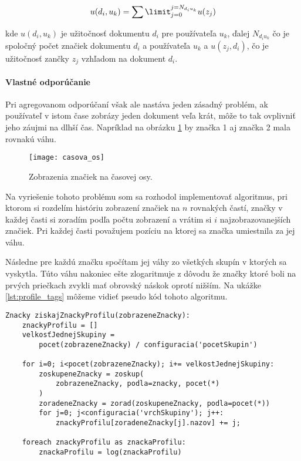 \begin{equation}\label{eq:aggregated_recommendation}
u(d_i, u_k) = \sum\limit_{j = 0}^{j = N_{d_i u_k}} u(z_j)
\end{equation}

kde \(u(d_i, u_k)\) je užitočnosť dokumentu \(d_i\) pre používateľa \(u_k\),
ďalej \(N_{d_i u_k}\) čo je spoločný počet značiek dokumentu \(d_i\) a používateľa
\(u_k\) a \(u(z_j, d_i)\), čo je užitočnosť zančky \(z_j\) vzhľadom na dokument 
\(d_i\).

\paragraph{Vlastné odporúčanie}

Pri agregovanom odporúčaní však ale nastáva jeden zásadný problém, 
ak používateľ v istom čase zobrázy jeden dokument veľa krát, môže to tak ovplivniť 
jeho záujmi na dlhší čas. Napríklad na obrázku \ref{fig:casova_os} by značka 1 aj
značka 2 mala rovnakú váhu.

\begin{figure}
    \begin{center}
        \texttt{[image: casova\_os]}
        \caption{Zobrazenia značiek na časovej osy.}
        \label{fig:casova_os}
    \end{center}
\end{figure}

Na vyriešenie tohoto problému som sa rozhodol implementovať algoritmus, pri ktorom si 
rozdelím históriu zobrazení značiek na \(n\) rovnakých častí, značky v každej časti 
si zoradím podľa počtu zobrazení a vrátim si \(i\) najzobrazovanejších značiek. 
Pri každej časti považujem pozíciu na ktorej sa značka umiestnila za jej váhu.

Následne pre každú značku spočítam jej váhy zo všetkých skupín v ktorých sa vyskytla. 
Túto váhu nakoniec ešte zlogaritmuje z dôvodu že značky ktoré boli na prvých priečkach 
zvykli mať obrovský náskok oprotí nižším. Na ukážke \ref{lst:profile_tags} môžeme
vidieť pseudo kód tohoto algoritmu.

\begin{lstlisting}[label=lst:profile_tags, caption=Získanie značiek profilu]
Znacky ziskajZnackyProfilu(zobrazeneZnacky):
    znackyProfilu = []
    velkosťJednejSkupiny = 
        pocet(zobrazeneZnacky) / configuracia('pocetSkupin')

    for i=0; i<pocet(zobrazeneZnacky); i+= velkostJednejSkupiny:
        zoskupeneZnacky = zoskup(
            zobrazeneZnacky, podla=znacky, pocet(*)
        )
        zoradeneZnacky = zorad(zoskupeneZnacky, podla=pocet(*))
        for j=0; j<configuracia('vrchSkupiny'); j++:
            znackyProfilu[zoradeneZnacky[j].nazov] += j;
    
    foreach znackyProfilu as znackaProfilu:
        znackaProfilu = log(znackaProfilu)
\end{lstlisting}

